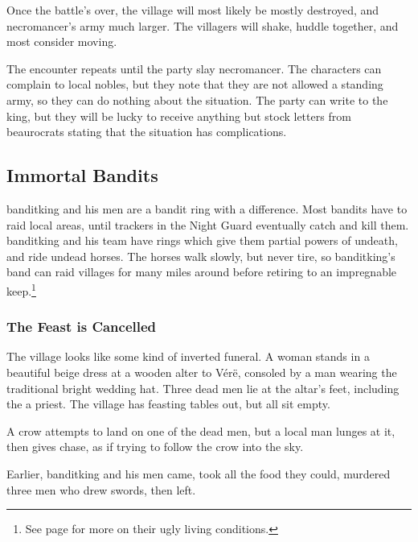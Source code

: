Once the battle's over, the village will most likely be mostly destroyed, and \gls{necromancer}'s army much larger.  The villagers will shake, huddle together, and most consider moving.

The encounter repeats until the party slay \gls{necromancer}.  The characters can complain to local nobles, but they note that they are not allowed a standing army, so they can do nothing about the situation.  The party can write to the king, but they will be lucky to receive anything but stock letters from beaurocrats stating that the situation has complications.

\subsection[Immortal Bandits]{Immortal Bandits}\label{immortalbandits}

\Gls{banditking} and his men are a bandit ring with a difference.  Most bandits have to raid local areas, until trackers in the Night Guard eventually catch and kill them.  \gls{banditking} and his team have rings which give them partial powers of undeath, and ride undead horses.  The horses walk slowly, but never tire, so \gls{banditking}'s band can raid villages for many miles around before retiring to an impregnable keep.\footnote{See page \pageref{necromancers_lair} for more on their ugly living conditions.}

\subsubsection{The Feast is Cancelled}

\begin{boxtext}

	The village looks like some kind of inverted funeral.  A woman stands in a beautiful beige dress at a wooden alter to V\'{e}r\"{e}, consoled by a man wearing the traditional bright wedding hat.  Three dead men lie at the altar's feet, including the a priest.  The village has feasting tables out, but all sit empty.

	A crow attempts to land on one of the dead men, but a local man lunges at it, then gives chase, as if trying to follow the crow into the sky.

\end{boxtext}

Earlier, \gls{banditking} and his men came, took all the food they could, murdered three men who drew swords, then left.

